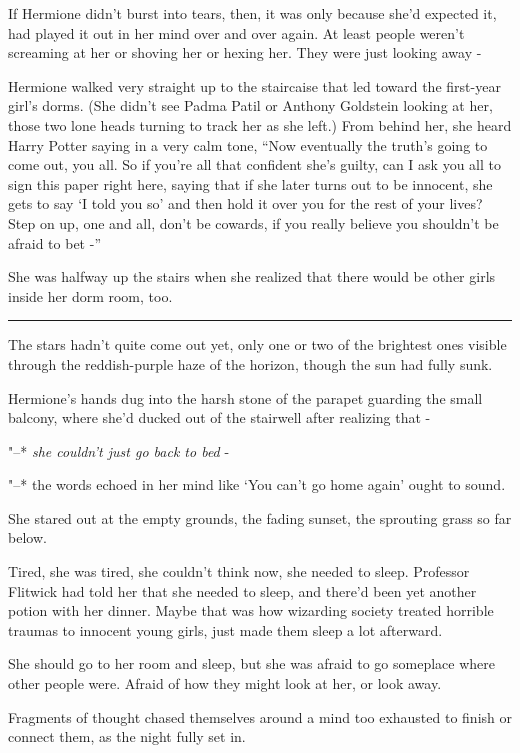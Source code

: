 If Hermione didn't burst into tears, then, it was only because she'd
expected it, had played it out in her mind over and over again. At least
people weren't screaming at her or shoving her or hexing her. They were
just looking away -

Hermione walked very straight up to the staircaise that led toward the
first-year girl's dorms. (She didn't see Padma Patil or Anthony
Goldstein looking at her, those two lone heads turning to track her as
she left.) From behind her, she heard Harry Potter saying in a very calm
tone, ``Now eventually the truth's going to come out, you all. So if
you're all that confident she's guilty, can I ask you all to sign this
paper right here, saying that if she later turns out to be innocent, she
gets to say `I told you so' and then hold it over you for the rest of
your lives? Step on up, one and all, don't be cowards, if you really
believe you shouldn't be afraid to bet -''

She was halfway up the stairs when she realized that there would be
other girls inside her dorm room, too.

\begin{center}\rule{3in}{0.4pt}\end{center}

The stars hadn't quite come out yet, only one or two of the brightest
ones visible through the reddish-purple haze of the horizon, though the
sun had fully sunk.

Hermione's hands dug into the harsh stone of the parapet guarding the
small balcony, where she'd ducked out of the stairwell after realizing
that -

"--* \emph{she couldn't just go back to bed} -

"--* the words echoed in her mind like `You can't go home again' ought to
sound.

She stared out at the empty grounds, the fading sunset, the sprouting
grass so far below.

Tired, she was tired, she couldn't think now, she needed to sleep.
Professor Flitwick had told her that she needed to sleep, and there'd
been yet another potion with her dinner. Maybe that was how wizarding
society treated horrible traumas to innocent young girls, just made them
sleep a lot afterward.

She should go to her room and sleep, but she was afraid to go someplace
where other people were. Afraid of how they might look at her, or look
away.

Fragments of thought chased themselves around a mind too exhausted to
finish or connect them, as the night fully set in.

